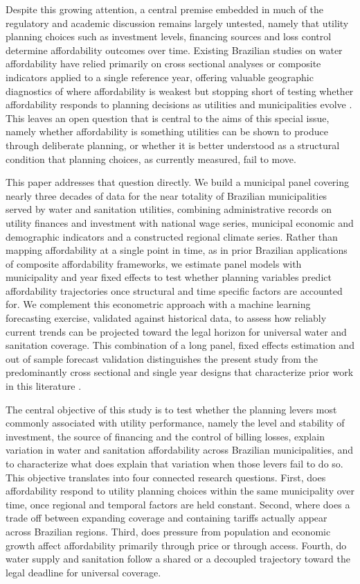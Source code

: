 \documentclass[pdflatex,sn-mathphys-num]{sn-jnl}%
\theoremstyle{thmstyleone}%
\theoremstyle{thmstyletwo}%
\theoremstyle{thmstylethree}%
\begin{document}
Despite this growing attention, a central premise embedded in much of the regulatory and academic discussion remains largely untested, namely that utility planning choices such as investment levels, financing sources and loss control determine affordability outcomes over time. Existing Brazilian studies on water affordability have relied primarily on cross sectional analyses or composite indicators applied to a single reference year, offering valuable geographic diagnostics of where affordability is weakest but stopping short of testing whether affordability responds to planning decisions as utilities and municipalities evolve \citep{Fagundes2025b,Fagundes2025a}. This leaves an open question that is central to the aims of this special issue, namely whether affordability is something utilities can be shown to produce through deliberate planning, or whether it is better understood as a structural condition that planning choices, as currently measured, fail to move.

This paper addresses that question directly. We build a municipal panel covering nearly three decades of data for the near totality of Brazilian municipalities served by water and sanitation utilities, combining administrative records on utility finances and investment with national wage series, municipal economic and demographic indicators and a constructed regional climate series. Rather than mapping affordability at a single point in time, as in prior Brazilian applications of composite affordability frameworks, we estimate panel models with municipality and year fixed effects to test whether planning variables predict affordability trajectories once structural and time specific factors are accounted for. We complement this econometric approach with a machine learning forecasting exercise, validated against historical data, to assess how reliably current trends can be projected toward the legal horizon for universal water and sanitation coverage. This combination of a long panel, fixed effects estimation and out of sample forecast validation distinguishes the present study from the predominantly cross sectional and single year designs that characterize prior work in this literature \citep{MocholiArce2024,RomeroGomez2024,Wanguba2024,Nongbri2025,Belhadj2026}.

The central objective of this study is to test whether the planning levers most commonly associated with utility performance, namely the level and stability of investment, the source of financing and the control of billing losses, explain variation in water and sanitation affordability across Brazilian municipalities, and to characterize what does explain that variation when those levers fail to do so. This objective translates into four connected research questions. First, does affordability respond to utility planning choices within the same municipality over time, once regional and temporal factors are held constant. Second, where does a trade off between expanding coverage and containing tariffs actually appear across Brazilian regions. Third, does pressure from population and economic growth affect affordability primarily through price or through access. Fourth, do water supply and sanitation follow a shared or a decoupled trajectory toward the legal deadline for universal coverage.
\end{document}
